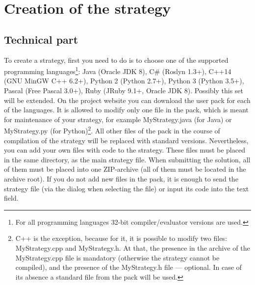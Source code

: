 \chapter{Creation of the strategy}
 
\section{Technical part}
 
To create a strategy, first you need to do is to choose one of the supported programming languages\footnote[14]{For all programming languages
32-bit compiler/evaluator versions are used.}: Java (Oracle JDK 8), C\# (Roslyn 1.3+), C++14 (GNU MinGW C++
6.2+), Python 2 (Python 2.7+), Python 3 (Python 3.5+), Pascal (Free Pascal 3.0+), Ruby (JRuby 9.1+, Oracle JDK 8). Possibly this set
will be extended. On the project website you can download the user pack for each of the languages. It is allowed to modify only one
file in the pack, which is meant for maintenance of your strategy, for example MyStrategy.java (for Java) or MyStrategy.py (for
Python)\footnote[15]{C++ is the exception, because for it, it is possible to modify two files: MyStrategy.cpp and MyStrategy.h. At that, the presence
in the archive of the MyStrategy.cpp file is mandatory (otherwise the strategy cannot be compiled), and the presence of the MyStrategy.h file --- optional. In case
of its absence a standard file from the pack will be used.}. All other files of the pack in the course of compilation of the strategy will be replaced
with standard versions. Nevertheless, you can add your own files with code to the strategy. These files must be placed in the same directory, as the
main strategy file. When submitting the solution, all of them must be placed into one ZIP-archive (all of them must be located in the archive root). If
you do not add new files in the pack, it is enough to send the strategy file (via the dialog when selecting the file) or input its code into
the text field.
 
